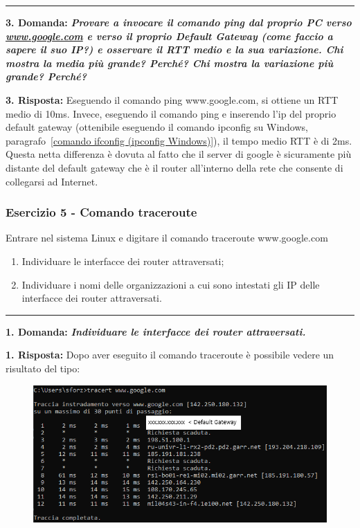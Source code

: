 \documentclass[a4paper]{article}
\newcommand{\longline}{\noindent\rule{\textwidth}{0.4pt}}
\begin{document}
	\noindent\longline\newline
	
	\noindent
	\textcolor{Red3}{\textbf{3. Domanda:}} \textbf{\emph{Provare a invocare il comando \textsf{ping} dal proprio PC verso \url{www.google.com} e verso il proprio Default Gateway (come faccio a sapere il suo IP?) e osservare il RTT medio e la sua variazione. Chi mostra la media più grande? Perché? Chi mostra la variazione più grande? Perché?}}\newline
	
	\noindent
	\textcolor{Green4}{\textbf{3. Risposta:}} Eseguendo il comando \textsf{ping www.google.com}, si ottiene un RTT medio di 10ms. Invece, eseguendo il comando \textsf{ping} e inserendo l'ip del proprio default gateway (ottenibile eseguendo il comando \textsf{ipconfig} su Windows, paragrafo~\ref{comando ifconfig (ipconfig Windows)}), il tempo medio RTT è di 2ms. Questa netta differenza è dovuta al fatto che il server di google è sicuramente più distante del default gateway che è il router all'interno della rete che consente di collegarsi ad Internet.\newpage
	
	\subsubsection{Esercizio 5 - Comando \textsf{traceroute}}
	
	Entrare nel sistema Linux e digitare il comando \textsf{traceroute www.google.com}
	\begin{enumerate}
		\item Individuare le interfacce dei router attraversati;
		
		\item Individuare i nomi delle organizzazioni a cui sono intestati gli IP delle interfacce dei router attraversati.
	\end{enumerate}
	
	\longline\newline
	
	\noindent
	\textcolor{Red3}{\textbf{1. Domanda:}} \textbf{\emph{Individuare le interfacce dei router attraversati.}}\newline
	
	\noindent
	\textcolor{Green4}{\textbf{1. Risposta:}} Dopo aver eseguito il comando \textsf{traceroute} è possibile vedere un risultato del tipo:
	\begin{figure}[!htp]
		\centering
		\includegraphics[width=\textwidth]{img/wireshark/ex5-1.png}
	\end{figure}
	
\end{document}
